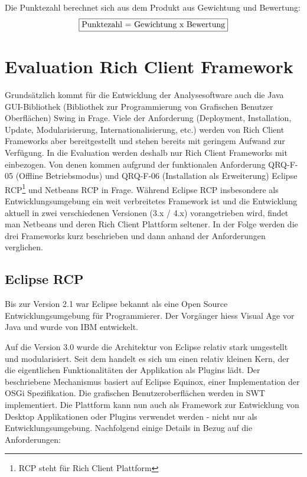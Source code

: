 Die Punktezahl berechnet sich aus dem Produkt aus Gewichtung und Bewertung:
 \begin{align*}
\fbox{Punktezahl = Gewichtung x Bewertung}
\end{align*}
\section{Evaluation Rich Client Framework}
Grundsätzlich kommt für die Entwicklung der Analysesoftware auch die Java GUI-Bibliothek (Bibliothek zur Programmierung von Grafischen Benutzer Oberflächen) Swing in Frage. Viele der Anforderung (Deployment, Installation, Update, Modularisierung, Internationalisierung, etc.) werden von Rich Client Frameworks aber bereitgestellt und stehen bereits mit geringem Aufwand zur Verfügung. In die Evaluation werden deshalb nur Rich Client Frameworks mit einbezogen. Von denen kommen aufgrund der funktionalen Anforderung QRQ-F-05 (Offline Betriebsmodus) und QRQ-F-06 (Installation als Erweiterung) Eclipse RCP\footnote{RCP steht für Rich Client Plattform} und Netbeans RCP in Frage. Während Eclipse RCP insbesondere als Entwicklungsumgebung ein weit verbreitetes Framework ist und die Entwicklung aktuell in zwei verschiedenen Versionen (3.x / 4.x) vorangetrieben wird, findet man Netbeans und deren Rich Client Plattform seltener. In der Folge werden die drei Frameworks kurz beschrieben und dann anhand der Anforderungen verglichen.


\subsection{Eclipse RCP}
Bis zur Version 2.1 war Eclipse bekannt als eine Open Source Entwicklungsumgebung für Programmierer. Der Vorgänger hiess Visual Age vor Java und wurde von IBM entwickelt. 

Auf die Version 3.0 wurde die Architektur von Eclipse relativ stark umgestellt und modularisiert. Seit dem handelt es sich um einen relativ kleinen Kern, der die eigentlichen Funktionalitäten der Applikation als Plugins lädt. Der beschriebene Mechanismus basiert auf Eclipse Equinox, einer Implementation der OSGi Spezifikation. Die grafischen Benutzeroberflächen werden in SWT implementiert. Die Plattform kann nun auch als Framework zur Entwicklung von Desktop Applikationen oder Plugins verwendet werden - nicht nur als Entwicklungsumgebung. Nachfolgend einige Details in Bezug auf die Anforderungen:

